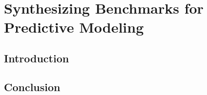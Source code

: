 \chapter{Synthesizing Benchmarks for Predictive Modeling}

\section{Introduction}

\lipsum[1-2]



\section{Conclusion}

\lipsum[1-2]
